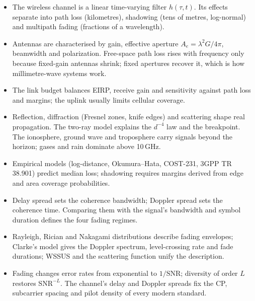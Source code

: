\begin{itemize}
\item The wireless channel is a linear time-varying filter $h(\tau,t)$. Its effects separate into path
loss (kilometres), shadowing (tens of metres, log-normal) and multipath fading (fractions of a
wavelength).
\item Antennas are characterised by gain, effective aperture $A_e=\lambda^2G/4\pi$, beamwidth and
polarization. Free-space path loss rises with frequency only because fixed-gain antennas shrink;
fixed apertures recover it, which is how millimetre-wave systems work.
\item The link budget balances EIRP, receive gain and sensitivity against path loss and margins;
the uplink usually limits cellular coverage.
\item Reflection, diffraction (Fresnel zones, knife edges) and scattering shape real propagation. The
two-ray model explains the $d^{-4}$ law and the breakpoint. The ionosphere, ground wave and
troposphere carry signals beyond the horizon; gases and rain dominate above 10\,GHz.
\item Empirical models (log-distance, Okumura--Hata, COST-231, 3GPP TR 38.901) predict median loss;
shadowing requires margins derived from edge and area coverage probabilities.
\item Delay spread sets the coherence bandwidth; Doppler spread sets the coherence time. Comparing them
with the signal's bandwidth and symbol duration defines the four fading regimes.
\item Rayleigh, Rician and Nakagami distributions describe fading envelopes; Clarke's model gives
the Doppler spectrum, level-crossing rate and fade durations; WSSUS and the scattering function unify
the description.
\item Fading changes error rates from exponential to $1/\text{SNR}$; diversity of order $L$ restores
$\text{SNR}^{-L}$. The channel's delay and Doppler spreads fix the CP, subcarrier spacing and pilot
density of every modern standard.
\end{itemize}





